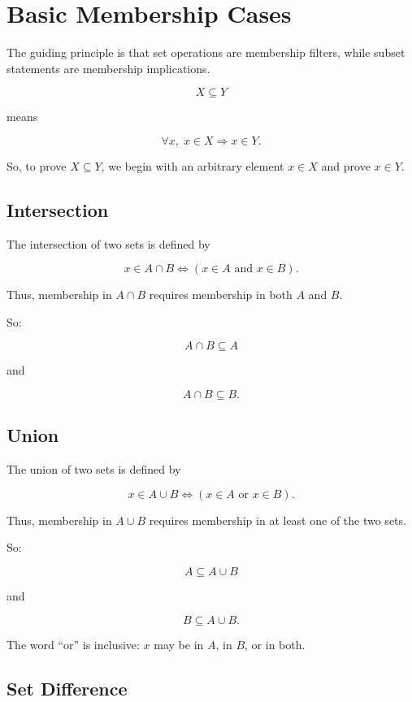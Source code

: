 \documentclass{article}
\begin{document}
	
	\section{Basic Membership Cases}
	
	The guiding principle is that set operations are membership filters, while subset statements are membership implications.
	
	$$
	X \subseteq Y
	$$
	
	means
	
	$$
	\forall x,\; x \in X \Rightarrow x \in Y.
	$$
	
	So, to prove $X \subseteq Y$, we begin with an arbitrary element $x \in X$ and prove $x \in Y$.
	
	\subsection{Intersection}
	
	The intersection of two sets is defined by
	
	$$
	x \in A \cap B
	\iff
	(x \in A \text{ and } x \in B).
	$$
	
	Thus, membership in $A \cap B$ requires membership in both $A$ and $B$.
	
	So:
	
	$$
	A \cap B \subseteq A
	$$
	
	and
	
	$$
	A \cap B \subseteq B.
	$$
	
	\subsection{Union}
	
	The union of two sets is defined by
	
	$$
	x \in A \cup B
	\iff
	(x \in A \text{ or } x \in B).
	$$
	
	Thus, membership in $A \cup B$ requires membership in at least one of the two sets.
	
	So:
	
	$$
	A \subseteq A \cup B
	$$
	
	and
	
	$$
	B \subseteq A \cup B.
	$$
	
	The word ``or'' is inclusive: $x$ may be in $A$, in $B$, or in both.
	
	\subsection{Set Difference}
	
\end{document}
